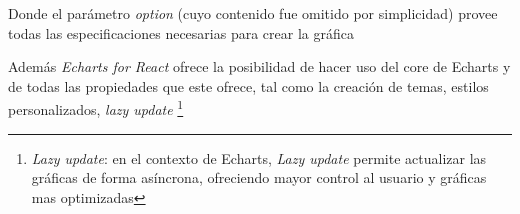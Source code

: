 Donde el parámetro \emph{option} (cuyo contenido fue omitido por simplicidad) provee todas las especificaciones necesarias para crear la gráfica

Además \emph{Echarts for React} ofrece la posibilidad de hacer uso del core de Echarts y de todas las propiedades que este ofrece, tal como la creación de temas, estilos personalizados, \textit{lazy update} \footnote{\textit{Lazy update}: en el contexto de Echarts, \emph{Lazy update} permite actualizar las gráficas de forma asíncrona, ofreciendo mayor control al usuario y gráficas mas optimizadas}






